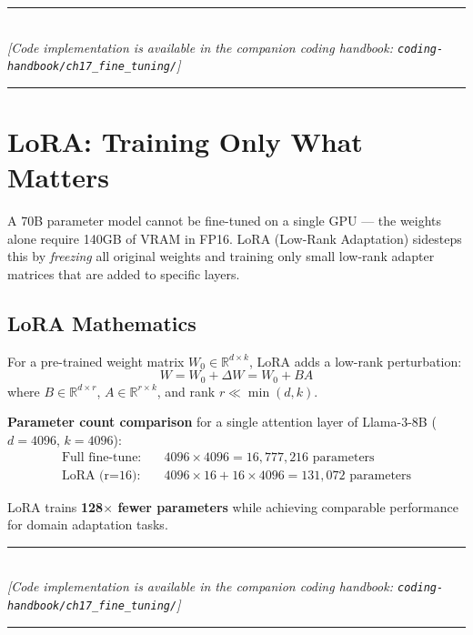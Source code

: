\begin{center}
\noindent\rule{0.6\textwidth}{0.4pt} \\
\vspace{0.3em}
\textit{[Code implementation is available in the companion coding handbook: \texttt{coding-handbook/ch17\_fine\_tuning/}]} \\
\noindent\rule{0.6\textwidth}{0.4pt}
\end{center}


\section{LoRA: Training Only What Matters}

A 70B parameter model cannot be fine-tuned on a single GPU — the weights alone require 140GB of VRAM in FP16. LoRA (Low-Rank Adaptation) sidesteps this by \textit{freezing} all original weights and training only small low-rank adapter matrices that are added to specific layers.

\subsection{LoRA Mathematics}
For a pre-trained weight matrix $W_0 \in \mathbb{R}^{d \times k}$, LoRA adds a low-rank perturbation:
\begin{equation}
W = W_0 + \Delta W = W_0 + BA
\end{equation}
where $B \in \mathbb{R}^{d \times r}$, $A \in \mathbb{R}^{r \times k}$, and rank $r \ll \min(d, k)$.

\textbf{Parameter count comparison} for a single attention layer of Llama-3-8B ($d=4096$, $k=4096$):
\begin{align}
\text{Full fine-tune:} &\quad 4096 \times 4096 = 16{,}777{,}216 \text{ parameters} \\
\text{LoRA (r=16):} &\quad 4096 \times 16 + 16 \times 4096 = 131{,}072 \text{ parameters}
\end{align}

LoRA trains \textbf{128$\times$ fewer parameters} while achieving comparable performance for domain adaptation tasks.


\begin{center}
\noindent\rule{0.6\textwidth}{0.4pt} \\
\vspace{0.3em}
\textit{[Code implementation is available in the companion coding handbook: \texttt{coding-handbook/ch17\_fine\_tuning/}]} \\
\noindent\rule{0.6\textwidth}{0.4pt}
\end{center}


